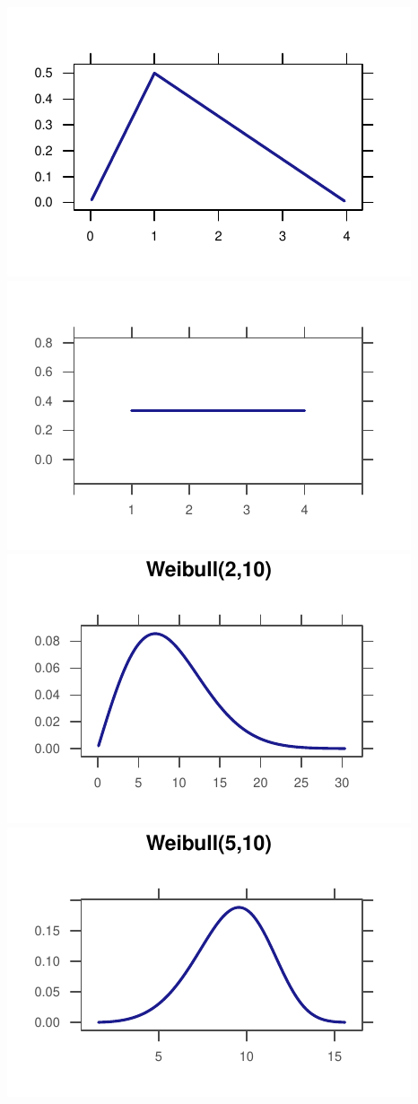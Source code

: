 \documentclass[twoside]{book}\usepackage[]{graphicx}\usepackage[]{xcolor}
\makeatletter
\def\maxwidth{ %
  \ifdim\Gin@nat@width>\linewidth
    \linewidth
  \else
    \Gin@nat@width
  \fi
}
\newenvironment{knitrout}{}{} %
\makeatother
\begin{document}
\begin{knitrout}
{\centering \includegraphics[width=\maxwidth]{figures/fig-unnamed-chunk-73-1} 
\includegraphics[width=\maxwidth]{figures/fig-unnamed-chunk-73-2} 
\includegraphics[width=\maxwidth]{figures/fig-unnamed-chunk-73-3} 
\includegraphics[width=\maxwidth]{figures/fig-unnamed-chunk-73-4} 

}
\end{knitrout}
\end{document}
